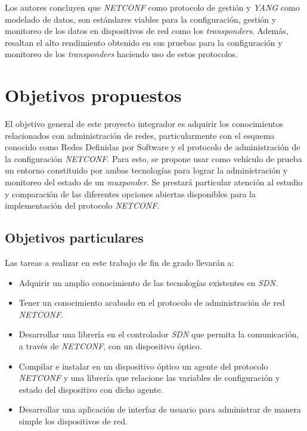 Los autores concluyen que \textit{NETCONF} como protocolo de gestión y \textit{YANG} como modelado de datos, son estándares viables para la configuración, gestión y monitoreo de los datos en dispositivos de red como los \textit{transponders}. 
Además, resaltan el alto rendimiento obtenido en sus pruebas para la configuración y monitoreo de los \textit{transponders} haciendo uso de estos protocolos. 


\section{Objetivos propuestos}

El objetivo general de este proyecto integrador es adquirir los conocimientos relacionados con administración de redes, particularmente con el esquema conocido como Redes Definidas por Software y el protocolo de administración de la configuración \textit{NETCONF}. Para esto, se propone usar como vehículo de prueba un entorno constituido por ambas tecnologías para lograr la administración y monitoreo del estado de un \textit{muxponder}. Se prestará particular atención al estudio y comparación de las diferentes opciones abiertas disponibles para la implementación del protocolo \textit{NETCONF}.

\subsection{Objetivos particulares}

Las tareas a realizar en este trabajo de fin de grado llevarán a:


\begin{itemize}
    \item Adquirir un amplio conocimiento de las tecnologías existentes en \textit{SDN}.   
    \item Tener un conocimiento acabado en el protocolo de administración de red \textit{NETCONF}.   
    \item Desarrollar una librería en el controlador \textit{SDN} que permita la comunicación, a través de \textit{NETCONF}, con un dispositivo óptico.   
    \item Compilar e instalar en un dispositivo óptico un agente del protocolo \textit{NETCONF} y una librería que relacione las variables de configuración y estado del dispositivo con dicho agente.   
    \item Desarrollar una aplicación de interfaz de usuario para administrar de manera simple los dispositivos de red.
\end{itemize}  
    
